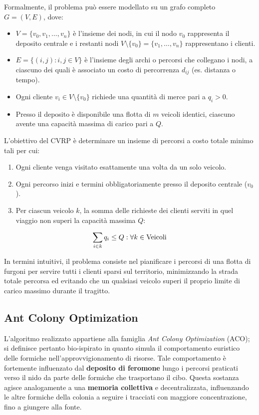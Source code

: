 \documentclass[11pt,a4paper]{article}
\begin{document}
Formalmente, il problema può essere modellato su un grafo completo $G = (V, E)$, dove:
\begin{itemize}
    \item $V = \{v_0, v_1, \dots, v_n\}$ è l'insieme dei nodi, in cui il nodo $v_0$ rappresenta il deposito centrale e i restanti nodi $V \setminus \{v_0\} = \{ v_1, \dots, v_n\}$ rappresentano i clienti.
    \item $E = \{(i,j) : i,j \in V\}$ è l'insieme degli archi o percorsi che collegano i nodi, a ciascuno dei quali è associato un costo di percorrenza $d_{ij}$ (es. distanza o tempo).
    \item Ogni cliente $v_i \in V \setminus \{v_0\}$ richiede una quantità di merce pari a $q_i > 0$.
    \item Presso il deposito è disponibile una flotta di $m$ veicoli identici, ciascuno avente una capacità massima di carico pari a $Q$.
\end{itemize}
\noindent
L'obiettivo del CVRP è determinare un insieme di percorsi a costo totale minimo tali per cui:
\begin{enumerate}
    \item Ogni cliente venga visitato esattamente una volta da un solo veicolo.
    \item Ogni percorso inizi e termini obbligatoriamente presso il deposito centrale ($v_0$).
    \item Per ciascun veicolo $k$, la somma delle richieste dei clienti serviti in quel viaggio non superi la capacità massima $Q$:
\end{enumerate}

\begin{equation}
\sum_{i \in k} q_{i} \le Q \space : \space \forall k \in \text{Veicoli}
\end{equation}

\noindent
In termini intuitivi, il problema consiste nel pianificare i percorsi di una flotta di furgoni per servire tutti i clienti sparsi sul territorio, minimizzando la strada totale percorsa ed evitando che un qualsiasi veicolo superi il proprio limite di carico massimo durante il tragitto.

\subsection{Ant Colony Optimization}

L'algoritmo realizzato appartiene alla famiglia \textit{Ant Colony Optimization} (ACO); si definisce pertanto bio-ispirato in quanto simula il comportamento euristico delle formiche nell'approvvigionamento di risorse. Tale comportamento è fortemente influenzato dal \textbf{deposito di feromone} lungo i percorsi praticati verso il nido da parte delle formiche che trasportano il cibo. Questa sostanza agisce analogamente a una \textbf{memoria collettiva} e decentralizzata, influenzando le altre formiche della colonia a seguire i tracciati con maggiore concentrazione, fino a giungere alla fonte.
\end{document}
